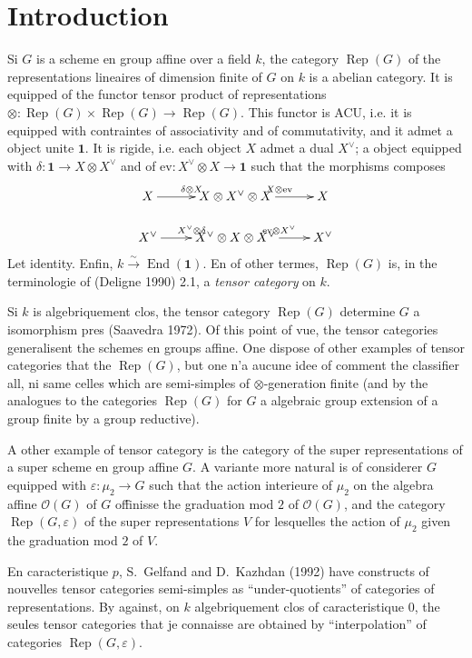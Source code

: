 \documentclass[11pt,a4paper]{article}
\theoremstyle{plain}
\theoremstyle{definition}
\DeclareMathOperator{\End}{End}
\DeclareMathOperator{\Rep}{Rep}
\newcommand{\eps}{\varepsilon}
\newcommand{\isom}{\xrightarrow{\sim}}
\newcommand{\ev}{\mathrm{ev}}
\begin{document}
\section*{Introduction}

Si $G$ is a scheme en group affine over a field $k$, the category $\Rep(G)$ of the representations lineaires of dimension finite of $G$ on $k$ is a abelian category. It is equipped of the functor tensor product of representations $\otimes : \Rep(G) \times \Rep(G) \to \Rep(G)$. This functor is ACU, i.e. it is equipped with contraintes of associativity and of commutativity, and it admet a object unite $\mathbf{1}$. It is rigide, i.e. each object $X$ admet a dual $X^\vee$; a object equipped with $\delta : \mathbf{1} \to X \otimes X^\vee$ and of $\ev : X^\vee \otimes X \to \mathbf{1}$ such that the morphisms composes
\[
\xymatrix@R=1.5pc{
X \ar[r]^{\delta \otimes X} & X \otimes X^\vee \otimes X \ar[r]^{X \otimes \ev} & X \\
X^\vee \ar[r]^{X^\vee \otimes \delta} & X^\vee \otimes X \otimes X^\vee \ar[r]^{\ev \otimes X^\vee} & X^\vee
}
\]
Let identity. Enfin, $k \isom \End(\mathbf{1})$. En of other termes, $\Rep(G)$ is, in the terminologie of (Deligne 1990) 2.1, a \emph{tensor category} on $k$.

Si $k$ is algebriquement clos, the tensor category $\Rep(G)$ determine $G$ a isomorphism pres (Saavedra 1972). Of this point of vue, the tensor categories generalisent the schemes en groups affine. One dispose of other examples of tensor categories that the $\Rep(G)$, but one n'a aucune idee of comment the classifier all, ni same celles which are semi-simples of $\otimes$-generation finite (and by the analogues to the categories $\Rep(G)$ for $G$ a algebraic group extension of a group finite by a group reductive).

A other example of tensor category is the category of the super representations of a super scheme en group affine $G$. A variante more natural is of considerer $G$ equipped with $\eps : \mu_2 \to G$ such that the action interieure of $\mu_2$ on the algebra affine $\mathcal{O}(G)$ of $G$ of\'finisse the graduation mod $2$ of $\mathcal{O}(G)$, and the category $\Rep(G, \eps)$ of the super representations $V$ for lesquelles the action of $\mu_2$ given the graduation mod $2$ of $V$.

En caracteristique $p$, S.~Gelfand and D.~Kazhdan (1992) have constructs of nouvelles tensor categories semi-simples as ``under-quotients'' of categories of representations. By against, on $k$ algebriquement clos of caracteristique $0$, the seules tensor categories that je connaisse are obtained by ``interpolation'' of categories $\Rep(G, \eps)$.
\end{document}
